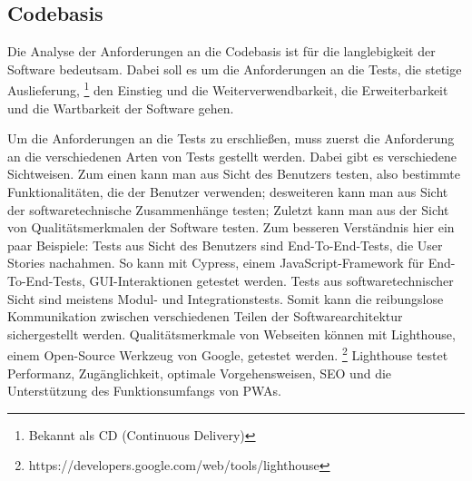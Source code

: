 \subsection{Codebasis}
\label{subsec:codebasis}
Die Analyse der Anforderungen an die Codebasis ist für die langlebigkeit der Software bedeutsam.
Dabei soll es um die Anforderungen an die Tests, die stetige Auslieferung, \footnote{Bekannt als CD (Continuous Delivery)}
den Einstieg und die Weiterverwendbarkeit, die Erweiterbarkeit und die Wartbarkeit der Software gehen. 

Um die Anforderungen an die Tests zu erschließen, muss zuerst die Anforderung an die verschiedenen
Arten von Tests gestellt werden. Dabei gibt es verschiedene Sichtweisen. Zum einen kann man aus
Sicht des Benutzers testen, also bestimmte Funktionalitäten, die der Benutzer verwenden; desweiteren
kann man aus Sicht der softwaretechnische Zusammenhänge testen; Zuletzt kann man aus der Sicht von
Qualitätsmerkmalen der Software testen.\cite{WikiSoftwaretest} Zum besseren Verständnis hier ein
paar Beispiele: Tests aus Sicht des Benutzers sind End-To-End-Tests, die User Stories nachahmen.
So kann mit Cypress, einem JavaScript-Framework für End-To-End-Tests, GUI-Interaktionen getestet werden.
Tests aus softwaretechnischer Sicht sind meistens Modul- und Integrationstests. Somit kann die reibungslose
Kommunikation zwischen verschiedenen Teilen der Softwarearchitektur sichergestellt werden. Qualitätsmerkmale
von Webseiten können mit Lighthouse, einem Open-Source Werkzeug von Google, getestet werden. \footnote{https://developers.google.com/web/tools/lighthouse}
Lighthouse testet Performanz, Zugänglichkeit, optimale Vorgehensweisen, SEO und die Unterstützung
des Funktionsumfangs von PWAs.


